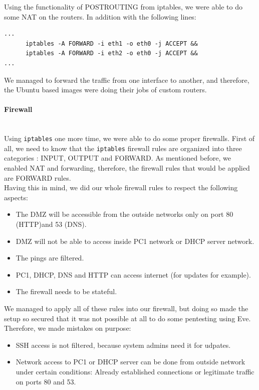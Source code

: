 \documentclass[a4paper,11pt,singlespacing]{article}
\begin{document}
Using the functionality of POSTROUTING from iptables, we were able to do some NAT on the routers. In addition with the following lines:
\begin{lstlisting}
...
      iptables -A FORWARD -i eth1 -o eth0 -j ACCEPT &&
      iptables -A FORWARD -i eth2 -o eth0 -j ACCEPT &&
...
\end{lstlisting}

We managed to forward the traffic from one interface to another, and therefore, the Ubuntu based images were doing their jobs of custom routers.

\paragraph{Firewall}
\leavevmode\\
Using \texttt{iptables} one more time, we were able to do some proper firewalls. First of all, we need to know that the \texttt{iptables} firewall rules are organized into three categories : INPUT, OUTPUT and FORWARD. As mentioned before, we enabled NAT and forwarding, therefore, the firewall rules that would be applied are FORWARD rules.\\

Having this in mind, we did our whole firewall rules to respect the following aspects:
\begin{itemize}
    \item The DMZ will be accessible from the outside networks only on port 80 (HTTP)and 53 (DNS).
    \item DMZ will not be able to access inside PC1 network or DHCP server network.
    \item The pings are filtered.
    \item PC1, DHCP, DNS and HTTP can access internet (for updates for example).
    \item The firewall needs to be stateful.
\end{itemize}
We managed to apply all of these rules into our firewall, but doing so made the setup so secured that it was not possible at all to do some pentesting using Eve. Therefore, we made mistakes on purpose:
\begin{itemize}
    \item SSH access is not filtered, because system admins need it for udpates.
    \item Network access to PC1 or DHCP server can be done from outside network under certain conditions: Already established connections or legitimate traffic on ports 80 and 53.
\end{itemize}
\end{document}
